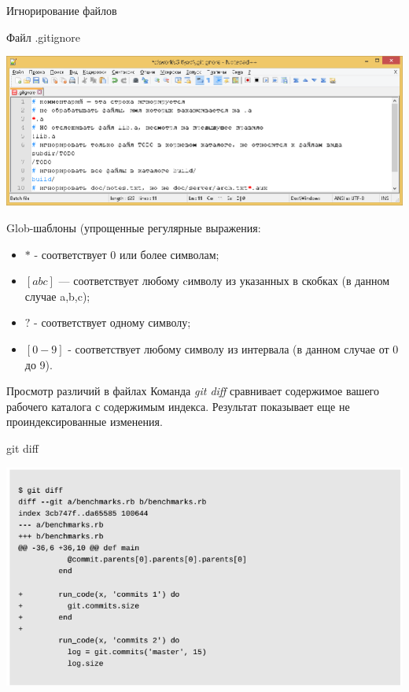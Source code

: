 \documentclass{beamer}
\begin{document}
\begin{frame}{Игнорирование файлов}
\begin{block}{Файл .gitignore}
\begin{center}
\includegraphics[scale=0.3]{images/gitignore-2.png}
\end{center}
\end{block}
Glob-шаблоны (упрощенные регулярные выражения:
\begin{itemize}
\item $*$ - соответствует 0 или более символам; 
\item $[abc]$ — соответствует любому cимволу из указанных в скобках  (в данном случае a,b,c);
\item $?$ - соответствует одному символу; 
\item $[0-9]$ - соответствует любому символу из интервала (в данном случае от 0 до 9).
\end{itemize}
\end{frame}

\begin{frame}{Просмотр различий в файлах}
Команда \textit{git diff} сравнивает содержимое вашего рабочего каталога с содержимым индекса.
Результат показывает еще не проиндексированные изменения.
\begin{block}{git diff}
\begin{center}
\includegraphics[scale=0.4]{images/diff-1.png}
\end{center}
\end{block}
\end{frame}
\end{document}
